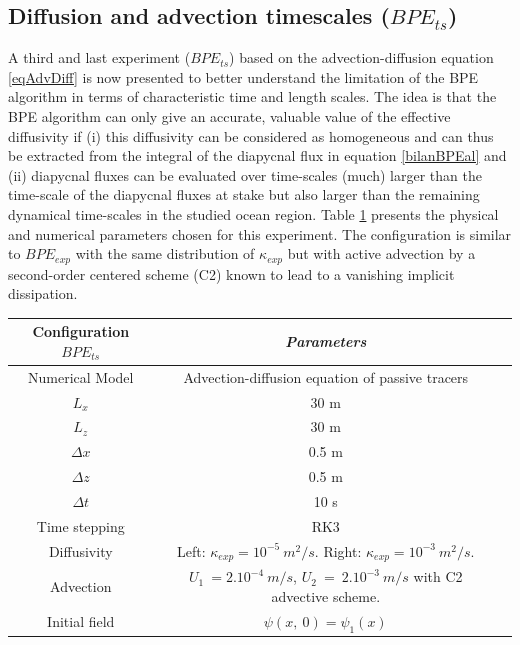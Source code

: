 \subsection{Diffusion and advection timescales ($BPE_{ts}$)}
A third and last experiment ($BPE_{ts}$) based on the advection-diffusion equation \ref{eqAdvDiff} is now presented to better understand the limitation of the BPE algorithm in terms of characteristic time and length scales. The idea is that the BPE algorithm can only give an accurate, valuable value of the effective diffusivity if (i) this diffusivity can be considered as homogeneous and can thus be extracted from the integral of the diapycnal flux in equation \ref{bilanBPEal} and (ii) diapycnal fluxes can be evaluated over time-scales (much) larger than the time-scale of the diapycnal fluxes at stake but also larger than the remaining dynamical time-scales in the studied ocean region.
Table \ref{tab_NUMLAB_ts} presents the physical and numerical parameters chosen for this experiment. The configuration is similar to $BPE_{exp}$ with the same distribution of $\kappa_{exp}$ but with active advection by a second-order centered scheme (C2) known to lead to a vanishing implicit dissipation.
\begin{table}[h]
        \centering
        \begin{tabular}{|c|c|c|}
                \hline
                Configuration $BPE_{ts}$ & \textit{Parameters}\\
                \hline 
                Numerical Model & Advection-diffusion equation of passive tracers\\
                $L_x$ & 30 m\\
                $L_z$ & 30 m\\
                $\Delta x$ & 0.5 m\\
                $\Delta z$ & 0.5 m\\
                $\Delta t$ & 10 s\\
                Time stepping & RK3 \\
                Diffusivity & Left: $\kappa_{exp} = 10^{-5} \ m^2/s$. Right: $\kappa_{exp} = 10^{-3} \ m^2/s$.\\
                Advection & $U_1\ = 2.10^{-4}\ m/s$, $U_2\ =\ 2.10^{-3}\ m/s$ with C2 advective scheme.\\
                Initial field & $\psi(x,\ 0)=\psi_1(x)$\\
                \hline
        \end{tabular}
        \label{tab_NUMLAB_ts}
\end{table}


